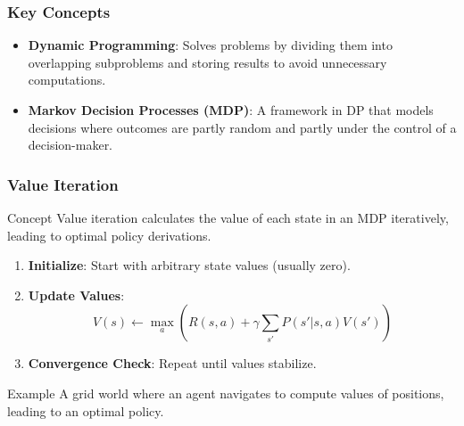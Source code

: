 \documentclass[aspectratio=169]{beamer}
\begin{document}
\begin{frame}[fragile]
    \frametitle{Key Concepts}
    \begin{itemize}
        \item \textbf{Dynamic Programming}: Solves problems by dividing them into overlapping subproblems and storing results to avoid unnecessary computations.
        \item \textbf{Markov Decision Processes (MDP)}: A framework in DP that models decisions where outcomes are partly random and partly under the control of a decision-maker.
    \end{itemize}
\end{frame}

\begin{frame}[fragile]
    \frametitle{Value Iteration}
    \begin{block}{Concept}
        Value iteration calculates the value of each state in an MDP iteratively, leading to optimal policy derivations.
    \end{block}
    
    \begin{enumerate}
        \item \textbf{Initialize}: Start with arbitrary state values (usually zero).
        \item \textbf{Update Values}:
            \begin{equation}
            V(s) \leftarrow \max_a \left( R(s, a) + \gamma \sum_{s'} P(s'|s, a)V(s') \right)
            \end{equation}
        \item \textbf{Convergence Check}: Repeat until values stabilize.
    \end{enumerate}
    
    \begin{block}{Example}
        A grid world where an agent navigates to compute values of positions, leading to an optimal policy.
    \end{block}
\end{frame}
\end{document}
